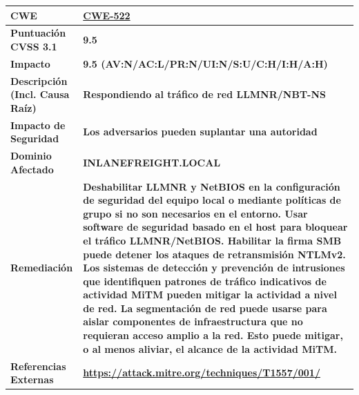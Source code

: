 {
\begin{table}[h!]
    \centering
    \begin{tabular}{|p{3cm}|p{15cm}|} 
        \hline
        \rowcolor{TableBgRowColor}        
        \cellcolor{HighVulnColor} \textbf{CWE} & 
        \textbf{\href{https://cwe.mitre.org/data/definitions/522.html}{CWE-522} } \\
        \hline
        \rowcolor{TableBgRowIntemediaColor}
        \cellcolor{HighVulnColor} \textbf{Puntuación CVSS 3.1} & 
        \textbf{9.5} \\
        \hline
        \rowcolor{TableBgRowColor}
        \cellcolor{HighVulnColor} \textbf{Impacto} & 
        \textbf{9.5 (AV:N/AC:L/PR:N/UI:N/S:U/C:H/I:H/A:H)} \\
        \hline
        \rowcolor{TableBgRowIntemediaColor}        
        \cellcolor{HighVulnColor} \textbf{Descripción (Incl. Causa Raíz)} & 
        \textbf{Respondiendo al tráfico de red LLMNR/NBT-NS} \\
        \hline        
        \rowcolor{TableBgRowColor}        
        \cellcolor{HighVulnColor} \textbf{Impacto de Seguridad} & 
        \textbf{Los adversarios pueden suplantar una autoridad} \\
        \hline
        \rowcolor{TableBgRowIntemediaColor}        
        \cellcolor{HighVulnColor} \textbf{Dominio Afectado} & 
        \textbf{INLANEFREIGHT.LOCAL} \\
        \hline
        \rowcolor{TableBgRowColor}        
        \cellcolor{HighVulnColor} \textbf{Remediación} & 
        \textbf{
Deshabilitar LLMNR y NetBIOS en la configuración de seguridad del equipo local o mediante políticas de grupo si no son necesarios en el entorno. 
Usar software de seguridad basado en el host para bloquear el tráfico LLMNR/NetBIOS. Habilitar la firma SMB puede detener los ataques de retransmisión NTLMv2. 
Los sistemas de detección y prevención de intrusiones que identifiquen patrones de tráfico indicativos de actividad MiTM pueden mitigar la actividad a nivel de red. 
La segmentación de red puede usarse para aislar componentes de infraestructura que no requieran acceso amplio a la red. Esto puede mitigar, o al menos aliviar, el alcance de la actividad MiTM. 
        } \\
        \hline
        \rowcolor{TableBgRowIntemediaColor}        
        \cellcolor{HighVulnColor} \textbf{Referencias Externas} & 
        \textbf{\url{https://attack.mitre.org/techniques/T1557/001/}} \\
        \hline
    \end{tabular}
\end{table}

}
